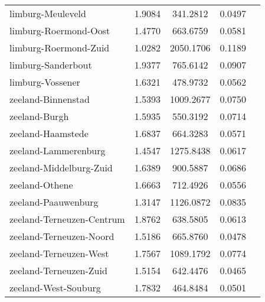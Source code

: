 \begin{longtable}{llccc}
	limburg-Meuleveld                         & 1.9084  & 341.2812  & 0.0497                 \\
	limburg-Roermond-Oost                     & 1.4770  & 663.6759  & 0.0581                 \\
	limburg-Roermond-Zuid                     & 1.0282  & 2050.1706 & 0.1189                 \\
	limburg-Sanderbout                        & 1.9377  & 765.6142  & 0.0907                 \\
	limburg-Vossener                          & 1.6321  & 478.9732  & 0.0562                 \\
	zeeland-Binnenstad                        & 1.5393  & 1009.2677 & 0.0750                 \\
	zeeland-Burgh                             & 1.5935  & 550.3192  & 0.0714                 \\
	zeeland-Haamstede                         & 1.6837  & 664.3283  & 0.0571                 \\
	zeeland-Lammerenburg                      & 1.4547  & 1275.8438 & 0.0617                 \\
	zeeland-Middelburg-Zuid                   & 1.6389  & 900.5887  & 0.0686                 \\
	zeeland-Othene                            & 1.6663  & 712.4926  & 0.0556                 \\
	zeeland-Paauwenburg                       & 1.3147  & 1126.0872 & 0.0835                 \\
	zeeland-Terneuzen-Centrum                 & 1.8762  & 638.5805  & 0.0613                 \\
	zeeland-Terneuzen-Noord                   & 1.5186  & 665.8760  & 0.0478                 \\
	zeeland-Terneuzen-West                    & 1.7567  & 1089.1792 & 0.0774                 \\
	zeeland-Terneuzen-Zuid                    & 1.5154  & 642.4476  & 0.0465                 \\
	zeeland-West-Souburg                      & 1.7832  & 464.8484  & 0.0501                 \\
	\hline
\end{longtable}
